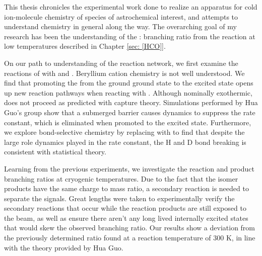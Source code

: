 This thesis chronicles the experimental work done to realize an apparatus for cold ion-molecule chemistry of species of astrochemical interest, and attempts to understand chemistry in general along the way. The overarching goal of my research has been the understanding of the : branching ratio from the  reaction at low temperatures described in Chapter \ref{sec: [HCO]}.

On our path to understanding of the  reaction network, we first examine the reactions of  with  and . Beryllium cation chemistry is not well understood. We find that promoting the  from the ground  ground state to the  excited state opens up new reaction pathways when reacting with . Although nominally exothermic,  does not proceed as predicted with capture theory. Simulations performed by Hua Guo's group show that a submerged barrier causes dynamics to suppress the rate constant, which is eliminated when promoted to the excited state. Furthermore, we explore bond-selective chemistry by replacing  with  to find that despite the large role dynamics played in the rate constant, the H and D bond breaking is consistent with statistical theory.

Learning from the previous experiments, we investigate the  reaction and product branching ratios at cryogenic temperatures. Due to the fact that the isomer products have the same charge to mass ratio, a secondary reaction is needed to separate the signals. Great lengths were taken to experimentally verify the secondary reactions that occur while the reaction products are still exposed to the beam, as well as ensure there aren't any long lived internally excited states that would skew the observed branching ratio. Our results show a deviation from the previously determined ratio found at a reaction temperature of 300 K, in line with the theory provided by Hua Guo.